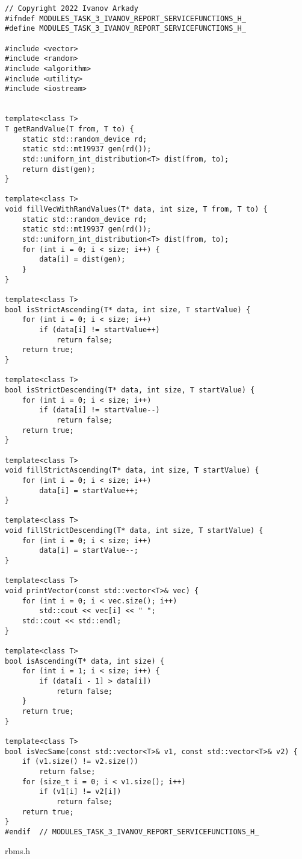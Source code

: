 \documentclass{report}
\begin{document}
\begin{lstlisting}
// Copyright 2022 Ivanov Arkady
#ifndef MODULES_TASK_3_IVANOV_REPORT_SERVICEFUNCTIONS_H_
#define MODULES_TASK_3_IVANOV_REPORT_SERVICEFUNCTIONS_H_

#include <vector>
#include <random>
#include <algorithm>
#include <utility>
#include <iostream>


template<class T>
T getRandValue(T from, T to) {
    static std::random_device rd;
    static std::mt19937 gen(rd());
    std::uniform_int_distribution<T> dist(from, to);
    return dist(gen);
}

template<class T>
void fillVecWithRandValues(T* data, int size, T from, T to) {
    static std::random_device rd;
    static std::mt19937 gen(rd());
    std::uniform_int_distribution<T> dist(from, to);
    for (int i = 0; i < size; i++) {
        data[i] = dist(gen);
    }
}

template<class T>
bool isStrictAscending(T* data, int size, T startValue) {
    for (int i = 0; i < size; i++)
        if (data[i] != startValue++)
            return false;
    return true;
}

template<class T>
bool isStrictDescending(T* data, int size, T startValue) {
    for (int i = 0; i < size; i++)
        if (data[i] != startValue--)
            return false;
    return true;
}

template<class T>
void fillStrictAscending(T* data, int size, T startValue) {
    for (int i = 0; i < size; i++)
        data[i] = startValue++;
}

template<class T>
void fillStrictDescending(T* data, int size, T startValue) {
    for (int i = 0; i < size; i++)
        data[i] = startValue--;
}

template<class T>
void printVector(const std::vector<T>& vec) {
    for (int i = 0; i < vec.size(); i++)
        std::cout << vec[i] << " ";
    std::cout << std::endl;
}

template<class T>
bool isAscending(T* data, int size) {
    for (int i = 1; i < size; i++) {
        if (data[i - 1] > data[i])
            return false;
    }
    return true;
}

template<class T>
bool isVecSame(const std::vector<T>& v1, const std::vector<T>& v2) {
    if (v1.size() != v2.size())
        return false;
    for (size_t i = 0; i < v1.size(); i++)
        if (v1[i] != v2[i])
            return false;
    return true;
}
#endif  // MODULES_TASK_3_IVANOV_REPORT_SERVICEFUNCTIONS_H_
\end{lstlisting}
rbms.h
\end{document}
